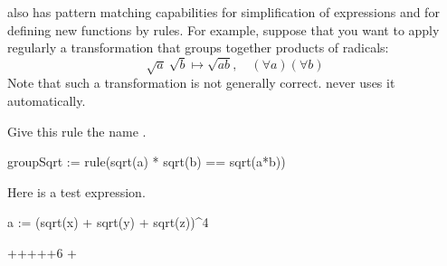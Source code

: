 {{{{{{{{\Language{} also has pattern matching capabilities for
simplification
of expressions and for defining new functions by rules.
For example, suppose that you want to apply regularly a transformation
that groups together products of radicals:
\begin{displaymath}
\sqrt{a}\:\sqrt{b} \mapsto \sqrt{ab}, \quad
(\forall a)(\forall b)
\end{displaymath}
Note that such a transformation is not generally correct.
\Language{} never uses it automatically.

\begin{xtc}
\begin{xtccomment}
Give this rule the name .
\end{xtccomment}
\begin{spadsrc}
groupSqrt := rule(sqrt(a) * sqrt(b) == sqrt(a*b)) 
\end{spadsrc}
\begin{TeXOutput}
\begin{fricasmath}{20}
\TIMES {}\TIMES {}\SYMBOL{\ ==\ }%
\TIMES {}%
\end{fricasmath}
\end{TeXOutput}
\end{xtc}
\begin{xtc}
\begin{xtccomment}
Here is a test expression.
\end{xtccomment}
\begin{spadsrc}
a := (sqrt(x) + sqrt(y) + sqrt(z))^4 
\end{spadsrc}
\begin{TeXOutput}
\begin{fricasmath}{21}
\TIMES {}+\TIMES {}\TIMES {}++\TIMES {}++6\TIMES {}%
\TIMES {}+%
\end{fricasmath}
\end{TeXOutput}
\end{xtc}
}}}}}}}}
